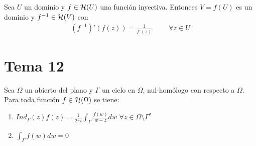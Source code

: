 \documentclass[12pt]{article}
\begin{document}
    \begin{teo} Sea $U$ un dominio y $f\in \mathcal{H}(U)$ una función inyectiva. Entonces $V=f(U)$ es un dominio y $f^{-1}\in \mathcal{H}(V)$ con 
    \begin{gather*}
        (f^{-1})'(f(z)) = \frac{1}{f'(z)} \hspace{1cm} \forall z \in U
    \end{gather*}
    \end{teo}

    \section{Tema 12}

    \begin{teo} Sea $\Omega$ un abierto del plano y $\Gamma$ un ciclo en $\Omega$, nul-homólogo con respecto a $\Omega$. Para toda función $f\in \mathcal{H}(\Omega)$ se tiene:
    \begin{enumerate}
        \item $\displaystyle Ind_\Gamma (z)f(z) = \frac{1}{2\pi i} \int_\Gamma \frac{f(w)}{w-z} dw$ \hspace{1cm} $\forall z \in \Omega \setminus \Gamma^*$
        \item $\displaystyle \int_\Gamma f(w) dw = 0$
    \end{enumerate}
    \end{teo}

    
    
\end{document}

